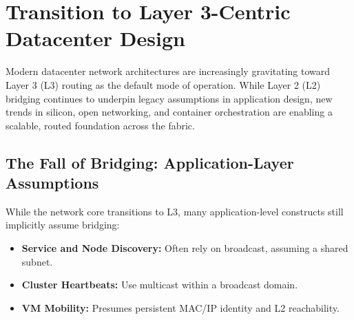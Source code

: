 


%






\section{Transition to Layer 3-Centric Datacenter Design}

Modern datacenter network architectures are increasingly gravitating toward Layer 3 (L3) routing as the default mode of operation. While Layer 2 (L2) bridging continues to underpin legacy assumptions in application design, new trends in silicon, open networking, and container orchestration are enabling a scalable, routed foundation across the fabric.

\subsection{The Fall of Bridging: Application-Layer Assumptions}

While the network core transitions to L3, many application-level constructs still implicitly assume bridging:

\begin{itemize}
  \item \textbf{Service and Node Discovery:} Often rely on broadcast, assuming a shared subnet.
  \item \textbf{Cluster Heartbeats:} Use multicast within a broadcast domain.
  \item \textbf{VM Mobility:} Presumes persistent MAC/IP identity and L2 reachability.
\end{itemize}

